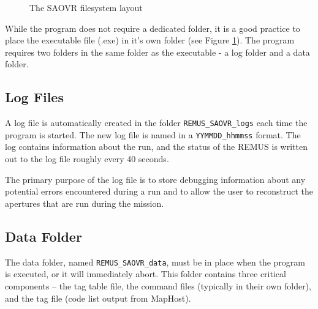 \documentclass[11pt]{article} %
\begin{document}
\begin{figure}[h]
\caption{The SAOVR filesystem layout}
\label{fig:filesystem}
\end{figure}


While the program does not require a dedicated folder, it is a good practice
to place the executable file (.exe) in it's own folder (see Figure \ref{fig:filesystem}). The program requires two folders in the same folder as the executable - a log folder and a data folder. 

\subsection{Log Files}

A log file is automatically created in the folder \mbox{\texttt{REMUS\_SAOVR\_logs}} each time the program is started. The new log file is named in a
\mbox{\texttt{YYMMDD\_hhmmss}} format. The log contains information about the run,  and the status of the REMUS is written out to the log file
roughly every 40 seconds.

The primary purpose of the log file is to store debugging information about any potential errors encountered during a run and to 
allow the user to reconstruct the apertures that are run during the mission.

\subsection{Data Folder}

The data folder, named \mbox{\texttt{REMUS\_SAOVR\_data}}, must be in place when the program is executed, or it will immediately abort. This folder
contains three critical components -- the tag table file, the command files (typically in their own folder), and the tag file (code list output from MapHost).
\end{document}

